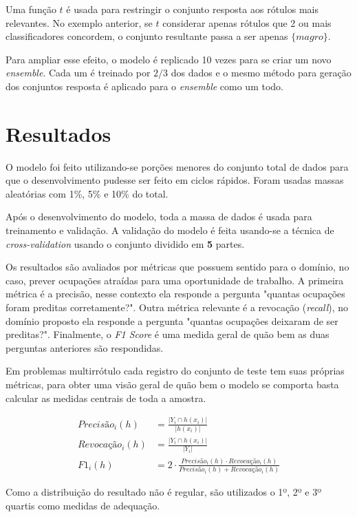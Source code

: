 \documentclass[runningheads,a4paper]{llncs}
\begin{document}
Uma função $t$ é usada para restringir o conjunto resposta aos rótulos mais relevantes. No exemplo anterior, se $t$ considerar apenas rótulos que 2 ou mais classificadores concordem, o conjunto resultante passa a ser apenas $\{magro\}$.

Para ampliar esse efeito, o modelo é replicado 10 vezes para se criar um novo \textit{ensemble}. Cada um é treinado por $2/3$ dos dados e o mesmo método para geração dos conjuntos resposta é aplicado para o \textit{ensemble} como um todo.

\section{Resultados} \label{sec:resultados}

O modelo foi feito utilizando-se porções menores do conjunto total de dados para que o desenvolvimento pudesse ser feito em ciclos rápidos. Foram usadas massas aleatórias com 1\%, 5\% e 10\% do total.

Após o desenvolvimento do modelo, toda a massa de dados é usada para treinamento e validação. A validação do modelo é feita usando-se a técnica de \textit{cross-validation} \cite{Kohavi95-as} usando o conjunto dividido em \textbf{5} partes.

Os resultados são avaliados por métricas que possuem sentido para o domínio, no caso, prever ocupações atraídas para uma oportunidade de trabalho. A primeira métrica é a precisão, nesse contexto ela responde a pergunta "quantas ocupações foram preditas corretamente?". Outra métrica relevante é a revocação (\textit{recall}), no domínio proposto ela responde a pergunta "quantas ocupações deixaram de ser preditas?". Finalmente, o \textit{F1 Score} é uma medida geral de quão bem as duas perguntas anteriores são respondidas.

Em problemas multirrótulo cada registro do conjunto de teste tem suas próprias métricas, para obter uma visão geral de quão bem o modelo se comporta basta calcular as medidas centrais de toda a amostra.

\begin{align*}
Precisão_i(h) &= \frac{|Y_i \cap h(x_i)|}{|h(x_i)|} \\
Revocação_i(h) &= \frac{|Y_i \cap h(x_i)|}{|Y_i|} \\
F1_i(h) &= 2 \cdot \frac{Precisão_i(h) \cdot Revocação_i(h)}{Precisão_i(h) + Revocação_i(h)} 
\end{align*}

Como a distribuição do resultado não é regular, são utilizados o 1º, 2º e 3º quartis como medidas de adequação.
\end{document}
